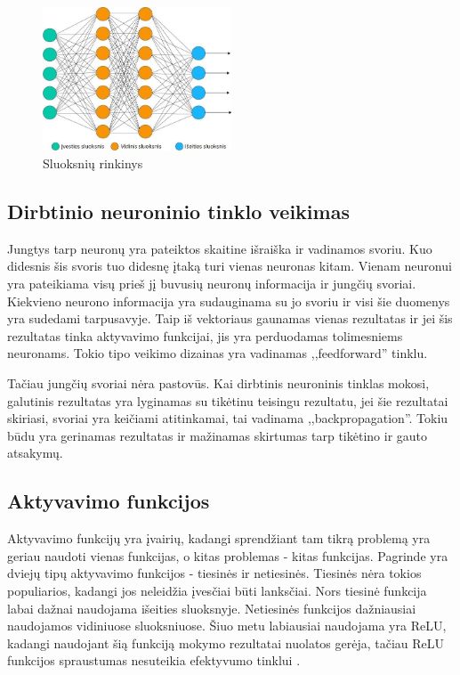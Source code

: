 \documentclass{VUMIFPSkursinis}
\begin{document}
\begin{figure}[h]
\centering
\includegraphics[width=0.5\textwidth]{img/NTSluoksniuSistema.jpeg}
\caption{Sluoksnių rinkinys}
\end{figure}

\subsection{Dirbtinio neuroninio tinklo veikimas}
Jungtys tarp neuronų yra pateiktos skaitine išraiška ir vadinamos svoriu. Kuo didesnis šis svoris tuo didesnę įtaką turi vienas neuronas kitam.
Vienam neuronui yra pateikiama visų prieš jį buvusių neuronų informacija ir jungčių svoriai. Kiekvieno neurono informacija yra sudauginama su
jo svoriu ir visi šie duomenys yra sudedami tarpusavyje. Taip iš vektoriaus gaunamas vienas rezultatas ir jei šis rezultatas tinka aktyvavimo
funkcijai, jis yra perduodamas tolimesniems neuronams. Tokio tipo veikimo dizainas yra vadinamas ,,feedforward'' tinklu.

Tačiau jungčių svoriai nėra pastovūs. Kai dirbtinis neuroninis tinklas mokosi, galutinis rezultatas yra lyginamas su tikėtinu teisingu rezultatu, jei šie
rezultatai skiriasi, svoriai yra keičiami atitinkamai, tai vadinama ,,backpropagation''. Tokiu būdu yra gerinamas rezultatas ir mažinamas skirtumas
tarp tikėtino ir gauto atsakymų.

\subsection{Aktyvavimo funkcijos}
Aktyvavimo funkcijų yra įvairių, kadangi sprendžiant tam tikrą problemą yra geriau naudoti vienas funkcijas, o kitas problemas - kitas funkcijas.
Pagrinde yra dviejų tipų aktyvavimo funkcijos - tiesinės ir netiesinės. Tiesinės nėra tokios populiarios, kadangi jos neleidžia įvesčiai
būti lanksčiai. Nors tiesinė funkcija labai dažnai naudojama išeities sluoksnyje.
Netiesinės funkcijos dažniausiai naudojamos vidiniuose sluoksniuose. Šiuo metu labiausiai naudojama yra ReLU, kadangi naudojant šią funkciją mokymo
rezultatai nuolatos gerėja, tačiau ReLU funkcijos spraustumas nesuteikia efektyvumo tinklui \cite{DBLP:journals/corr/XuWCL15}.
\end{document}
